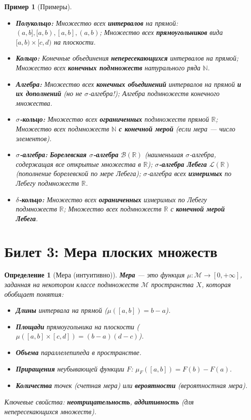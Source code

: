 \documentclass[a4paper, 12pt]{article}
\newtheorem{definition}{Определение}
\newtheorem{example}{Пример}
\newcommand{\R}{\mathbb{R}}
\newcommand{\N}{\mathbb{N}}
\newcommand{\B}{\mathcal{B}}
\newcommand{\Leb}{\mathcal{L}}
\newcommand{\1}{\mathbf{1}}
\begin{document}
\begin{example}[Примеры]
    \hfill
    \begin{itemize}
        \item \textbf{Полукольцо:} Множество всех \textbf{интервалов} на прямой: $(a,b], [a,b), [a,b], (a,b)$; Множество всех \textbf{прямоугольников} вида $[a,b) \times [c,d)$ на плоскости.
        \item \textbf{Кольцо:} Конечные объединения \textbf{непересекающихся} интервалов на прямой; Множество всех \textbf{конечных подмножеств} натурального ряда $\N$.
        \item \textbf{Алгебра:} Множество всех \textbf{конечных объединений} интервалов на прямой \textbf{и их дополнений} (но не $\sigma$-алгебра!); Алгебра подмножеств конечного множества.
        \item \textbf{$\sigma$-кольцо:} Множество всех \textbf{ограниченных} подмножеств прямой $\R$; Множество всех подмножеств $\N$ \textbf{с конечной мерой} (если мера — число элементов).
        \item \textbf{$\sigma$-алгебра:} \textbf{Борелевская $\sigma$-алгебра} $\B(\R)$ (наименьшая $\sigma$-алгебра, содержащая все открытые множества в $\R$); \textbf{$\sigma$-алгебра Лебега} $\Leb(\R)$ (пополнение борелевской по мере Лебега); $\sigma$-алгебра всех \textbf{измеримых} по Лебегу подмножеств $\R$.
        \item \textbf{$\delta$-кольцо:} Множество всех \textbf{ограниченных} измеримых по Лебегу подмножеств $\R$; Множество всех подмножеств $\R$ с \textbf{конечной мерой Лебега}.
    \end{itemize}
\end{example}

\section*{Билет 3: Мера плоских множеств}
\begin{definition}[Мера (интуитивно)]
    \textbf{Мера} — это функция $\mu: \mathcal{M} \to [0, +\infty]$, заданная на некотором классе подмножеств $\mathcal{M}$ пространства $X$, которая обобщает понятия:
    \begin{itemize}
        \item \textbf{Длины} интервала на прямой ($\mu([a,b]) = b - a$).
        \item \textbf{Площади} прямоугольника на плоскости ($\mu([a,b] \times [c,d]) = (b - a)(d - c)$).
        \item \textbf{Объема} параллелепипеда в пространстве.
        \item \textbf{Приращения} неубывающей функции $F$: $\mu_F([a,b]) = F(b) - F(a)$.
        \item \textbf{Количества} точек (счетная мера) или \textbf{вероятности} (вероятностная мера).
    \end{itemize}
    Ключевые свойства: \textbf{неотрицательность}, \textbf{аддитивность} (для непересекающихся множеств).
\end{definition}
\end{document}
